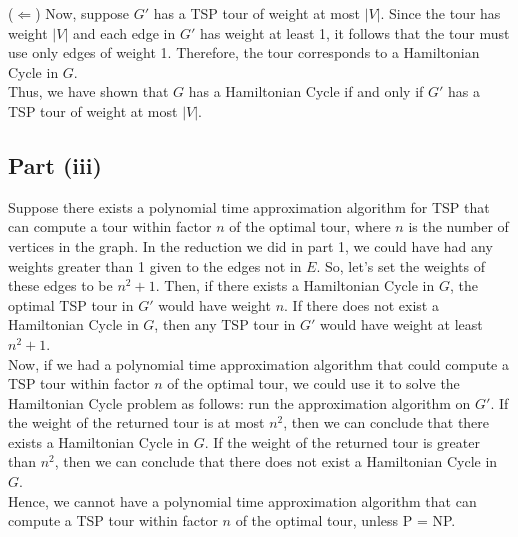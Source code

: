 \documentclass[a4paper]{article}
\begin{document}
\noindent
($\Leftarrow$) Now, suppose $G'$ has a TSP tour of weight at most $|V|$. Since the tour has weight $|V|$ and each edge in $G'$ has weight at least 1, it follows that the tour must use only edges of weight 1. Therefore, the tour corresponds to a Hamiltonian Cycle in $G$.\\

\noindent
Thus, we have shown that $G$ has a Hamiltonian Cycle if and only if $G'$ has a TSP tour of weight at most $|V|$.\\


\vspace{0.2in}
\subsection*{Part (iii)}
Suppose there exists a polynomial time approximation algorithm for TSP that can compute a tour within factor $n$ of the optimal tour, where $n$ is the number of vertices in the graph. In the reduction we did in part 1, we could have had any weights greater than 1 given to the edges not in $E$. So, let's set the weights of these edges to be $n^2 + 1$. Then, if there exists a Hamiltonian Cycle in $G$, the optimal TSP tour in $G'$ would have weight $n$. If there does not exist a Hamiltonian Cycle in $G$, then any TSP tour in $G'$ would have weight at least $n^2 + 1$.\\

\noindent
Now, if we had a polynomial time approximation algorithm that could compute a TSP tour within factor $n$ of the optimal tour, we could use it to solve the Hamiltonian Cycle problem as follows: run the approximation algorithm on $G'$. If the weight of the returned tour is at most $n^2$, then we can conclude that there exists a Hamiltonian Cycle in $G$. If the weight of the returned tour is greater than $n^2$, then we can conclude that there does not exist a Hamiltonian Cycle in $G$.\\

\noindent
Hence, we cannot have a polynomial time approximation algorithm that can compute a TSP tour within factor $n$ of the optimal tour, unless P = NP.
\end{document}
